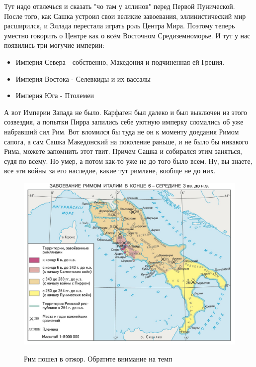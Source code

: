 Тут надо отвлечься и сказать "чо там у эллинов" перед Первой Пунической. После того, как Сашка устроил свои великие завоевания, эллинистический мир расширился, и Эллада перестала играть роль Центра Мира. Поэтому теперь уместно говорить о Центре как о всëм Восточном Средиземноморье. И тут у нас появились три могучие империи:

\begin{itemize}
	\item Империя Севера - собственно, Македония и подчиненная ей Греция.
	\item Империя Востока - Селевкиды и их вассалы
	\item Империя Юга - Птолемеи
\end{itemize}


А вот Империи Запада не было. Карфаген был далеко и был выключен из этого созвездия, а попытки Пирра запились себе уютную имперку сломались об уже набравший сил Рим. Вот вломился бы туда не он к моменту доедания Римом сапога, а сам Сашка Македонский на поколение раньше, и не было бы никакого Рима, можете запомнить этот твит. Причем Сашка и собирался этим заняться, судя по всему. Но умер, а потом как-то уже не до того было всем. Ну, вы знаете, все эти войны за его наследие, какие тут римляне, вообще не до них. 

\begin{figure}[h!tb]
	\centering\includegraphics[scale=0.3]{regional_hehemons/1613656352188889603.png}
	\label{fig:heh5} %
	\caption{Рим пошел в отжор. Обратите внимание на темп}
\end{figure}

